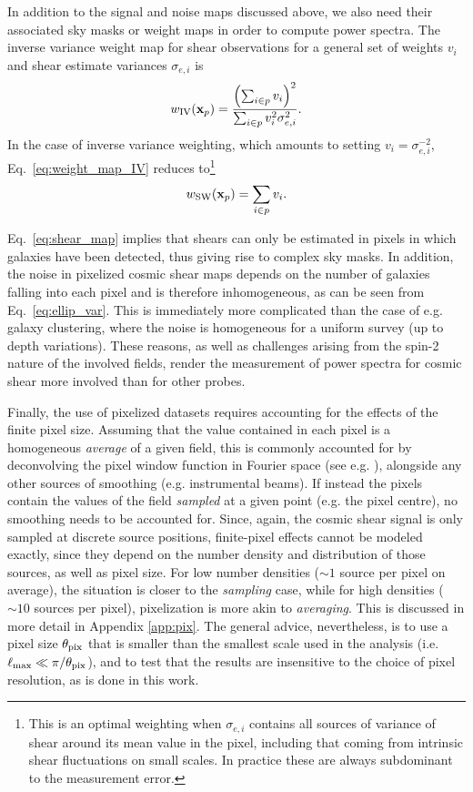 \documentclass[a4paper,11pt]{article}
\begin{document}
In addition to the signal and noise maps discussed above, we also need their associated sky masks or weight maps in order to compute power spectra. The inverse variance weight map for shear observations for a general set of weights $v_i$ and shear estimate variances $\sigma_{e,i}$ is
\begin{equation}\label{eq:weight_map_IV}
      w_{\rm IV}({\bf x}_p) = \frac{\left(\sum_{i\in p}v_i\right)^2}{\sum_{i\in p} v_i^2\sigma_{e,i}^2}.
\end{equation}
In the case of inverse variance weighting, which amounts to setting $v_i = \sigma_{e,i}^{-2}$, Eq.~\ref{eq:weight_map_IV} reduces to\footnote{This is an optimal weighting when $\sigma_{e,i}$ contains all sources of variance of shear around its mean value in the pixel, including that coming from intrinsic shear fluctuations on small scales. In practice these are always subdominant to the measurement error.}
        \begin{equation}\label{eq:weight_map_SW}
          w_{\rm SW}({\bf x}_p) = \sum_{i\in p}v_i.
        \end{equation}


      Eq.~\ref{eq:shear_map} implies that shears can only be estimated in pixels in which galaxies have been detected, thus giving rise to complex sky masks. In addition, the noise in pixelized cosmic shear maps depends on the number of galaxies falling into each pixel and is therefore inhomogeneous, as can be seen from Eq.~\ref{eq:ellip_var}. This is immediately more complicated than the case of e.g. galaxy clustering, where the noise is homogeneous for a uniform survey (up to depth variations). These reasons, as well as challenges arising from the spin-2 nature of the involved fields, render the measurement of power spectra for cosmic shear more involved than for other probes.
      
      Finally, the use of pixelized datasets requires accounting for the effects of the finite pixel size. Assuming that the value contained in each pixel is a homogeneous \emph{average} of a given field, this is commonly accounted for by deconvolving the pixel window function in Fourier space (see e.g. \cite{1004.3542}), alongside any other sources of smoothing (e.g. instrumental beams). If instead the pixels contain the values of the field \emph{sampled} at a given point (e.g. the pixel centre), no smoothing needs to be accounted for. Since, again, the cosmic shear signal is only sampled at discrete source positions, finite-pixel effects cannot be modeled exactly, since they depend on the number density and distribution of those sources, as well as pixel size. For low number densities ($\sim1$ source per pixel on average), the situation is closer to the \emph{sampling} case, while for high densities ($\sim10$ sources per pixel), pixelization is more akin to \emph{averaging}. This is discussed in more detail in Appendix \ref{app:pix}. The general advice, nevertheless, is to use a pixel size $\theta_{\rm pix}$ that is smaller than the smallest scale used in the analysis (i.e.  $\ell_{\rm max}\ll\pi/\theta_{\rm pix}$), and to test that the results are insensitive to the choice of pixel resolution, as is done in this work.
\end{document}
